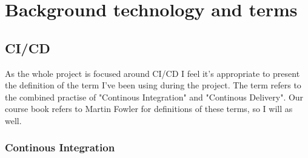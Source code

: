 %
%
%
%
%
%

\section{Background technology and terms}

\subsection{CI/CD}

As the whole project is focused around CI/CD I feel it's appropriate to present the definition of the term I've been using during the project. The term refers to the combined practise of "Continous Integration" and "Continous Delivery". Our course book refers to Martin Fowler for definitions of these terms, so I will as well.

\subsubsection{Continous Integration}


